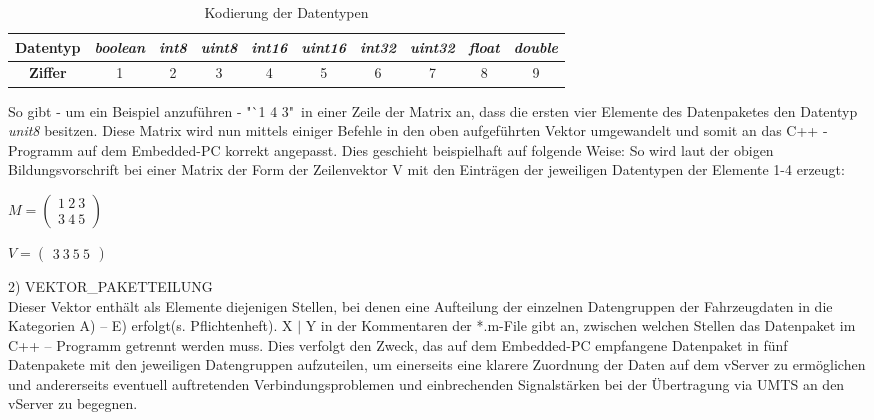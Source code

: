 \documentclass[fontsize = 12pt, paper = a4]{scrreprt}
\begin{document}
\begin{table}[h]

\caption{Kodierung der Datentypen}

\begin{tabular}{ c | c | c | c | c | c | c | c | c | c}
 
\toprule[1.5pt]
\textbf{Datentyp} & \textit{boolean} & \textit{int8} & \textit{uint8} & \textit{int16} & \textit{uint16} & \textit{int32} & \textit{uint32} & \textit{float} & \textit{double}  \\ 

\midrule

\textbf{Ziffer} & 1 & 2 & 3 & 4 & 5 & 6 & 7 & 8 & 9  \\

\bottomrule[1.5pt] 
 
\end{tabular}

\end{table}

So gibt - um ein Beispiel anzuführen - "`1 4 3"\ in einer Zeile der Matrix an, dass die ersten vier Elemente des Datenpaketes den Datentyp \textit{unit8} besitzen. Diese Matrix wird nun mittels einiger Befehle in den oben aufgeführten Vektor umgewandelt und somit an das C++ - Programm auf dem Embedded-PC korrekt angepasst. Dies geschieht beispielhaft auf folgende Weise: So wird laut der obigen Bildungsvorschrift bei einer Matrix der Form der Zeilenvektor V mit den Einträgen der jeweiligen Datentypen der Elemente 1-4 erzeugt: 

\vspace*{4mm}

$ M = \left( \begin{array}{c} 1 \ 2 \ 3 \\ 3 \ 4 \ 5 \end{array} \right)$

\vspace*{4mm}

$ V = \left( \begin{array}{c} 3 \ 3 \ 5 \ 5  \end{array} \right)$

\newpage
 

2) VEKTOR\_PAKETTEILUNG \\

Dieser Vektor enthält als Elemente diejenigen Stellen, bei denen eine Aufteilung der einzelnen Datengruppen der Fahrzeugdaten in die Kategorien A) -- E) erfolgt(s. Pflichtenheft). X $\mid$ Y  in der Kommentaren der *.m-File gibt an, zwischen welchen Stellen das Datenpaket im C++ -- Programm getrennt werden muss. Dies verfolgt den Zweck, das auf dem Embedded-PC empfangene Datenpaket in fünf Datenpakete mit den jeweiligen Datengruppen aufzuteilen, um einerseits eine klarere Zuordnung der Daten auf dem vServer zu ermöglichen und andererseits eventuell auftretenden Verbindungsproblemen und einbrechenden Signalstärken bei der Übertragung via UMTS an den vServer zu begegnen. \\
\end{document}
